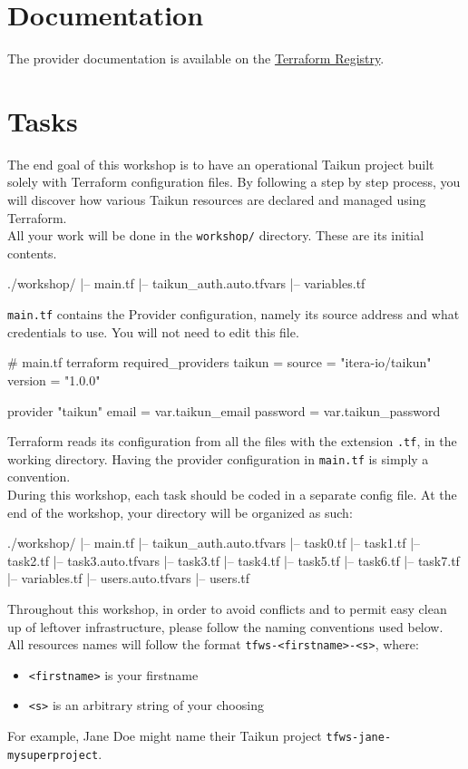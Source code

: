 \section{Documentation}
The provider documentation is available on the \href{https://registry.terraform.io/providers/itera-io/taikun/latest/docs}{Terraform Registry}.

\section{Tasks}
The end goal of this workshop is to have an operational Taikun project built solely with Terraform
configuration files.
By following a step by step process, you will discover how various Taikun
resources are declared and managed using Terraform.\\

All your work will be done in the \texttt{workshop/} directory. These are its initial contents.
\begin{raw}
./workshop/
|-- main.tf
|-- taikun_auth.auto.tfvars
|-- variables.tf
\end{raw}
\texttt{main.tf} contains the Provider configuration,
namely its source address and what credentials to use.
You will not need to edit this file.
\begin{tf}
# main.tf
terraform {
  required_providers {
    taikun = {
      source = "itera-io/taikun"
      version = "1.0.0"
    }
  }
}

provider "taikun" {
  email    = var.taikun_email
  password = var.taikun_password
}
\end{tf}
Terraform reads its configuration from all the files with the extension \texttt{.tf},
in the working directory.
Having the provider configuration in \texttt{main.tf} is simply a convention.\\

During this workshop, each task should be coded in a separate config file.
At the end of the workshop, your directory will be organized as such:
\begin{raw}
./workshop/
|-- main.tf
|-- taikun_auth.auto.tfvars
|-- task0.tf
|-- task1.tf
|-- task2.tf
|-- task3.auto.tfvars
|-- task3.tf
|-- task4.tf
|-- task5.tf
|-- task6.tf
|-- task7.tf
|-- variables.tf
|-- users.auto.tfvars
|-- users.tf
\end{raw}

\begin{warn}
  Throughout this workshop, in order to avoid conflicts and
  to permit easy clean up of leftover infrastructure, please follow the naming conventions used below.\\

  All resources names will follow the format \texttt{tfws-<firstname>-<s>}, where:
  \begin{itemize}
    \item \texttt{<firstname>} is your firstname
    \item \texttt{<s>} is an arbitrary string of your choosing
  \end{itemize}
  For example, Jane Doe might name their Taikun project \texttt{tfws-jane-mysuperproject}.
\end{warn}

